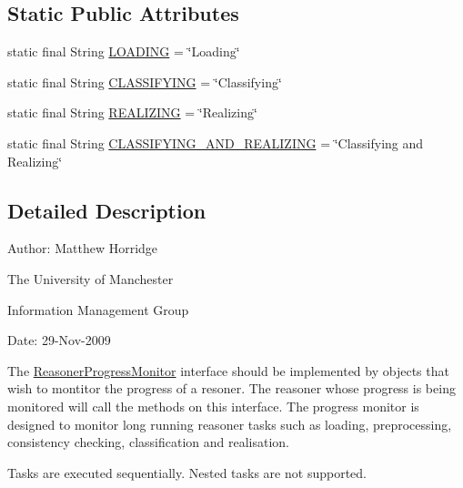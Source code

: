 \subsection*{Static Public Attributes}
\begin{DoxyCompactItemize}
\item 
static final String \hyperlink{interfaceorg_1_1semanticweb_1_1owlapi_1_1reasoner_1_1_reasoner_progress_monitor_a43cc26b4769cffdde5d48f1046478ff0}{L\-O\-A\-D\-I\-N\-G} = \char`\"{}Loading\char`\"{}
\item 
static final String \hyperlink{interfaceorg_1_1semanticweb_1_1owlapi_1_1reasoner_1_1_reasoner_progress_monitor_adc99bfb8641b16f5e2e00309ff59985f}{C\-L\-A\-S\-S\-I\-F\-Y\-I\-N\-G} = \char`\"{}Classifying\char`\"{}
\item 
static final String \hyperlink{interfaceorg_1_1semanticweb_1_1owlapi_1_1reasoner_1_1_reasoner_progress_monitor_a54ba2f85ade258995e72418cca364d70}{R\-E\-A\-L\-I\-Z\-I\-N\-G} = \char`\"{}Realizing\char`\"{}
\item 
static final String \hyperlink{interfaceorg_1_1semanticweb_1_1owlapi_1_1reasoner_1_1_reasoner_progress_monitor_ac2981bb79bf5542a4f9bfb199da50de1}{C\-L\-A\-S\-S\-I\-F\-Y\-I\-N\-G\-\_\-\-A\-N\-D\-\_\-\-R\-E\-A\-L\-I\-Z\-I\-N\-G} = \char`\"{}Classifying and Realizing\char`\"{}
\end{DoxyCompactItemize}


\subsection{Detailed Description}
Author\-: Matthew Horridge\par
 The University of Manchester\par
 Information Management Group\par
 Date\-: 29-\/\-Nov-\/2009 

The \hyperlink{interfaceorg_1_1semanticweb_1_1owlapi_1_1reasoner_1_1_reasoner_progress_monitor}{Reasoner\-Progress\-Monitor} interface should be implemented by objects that wish to montitor the progress of a resoner. The reasoner whose progress is being monitored will call the methods on this interface. The progress monitor is designed to monitor long running reasoner tasks such as loading, preprocessing, consistency checking, classification and realisation. 

Tasks are executed sequentially. Nested tasks are not supported. 

